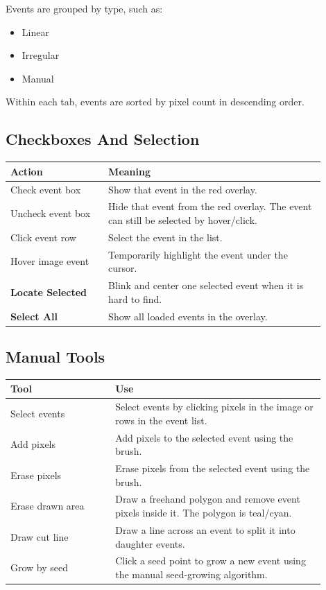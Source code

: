 \documentclass[11pt]{article}
\newcommand{\ui}[1]{\textbf{#1}}
\begin{document}
Events are grouped by type, such as:

\begin{itemize}
    \item Linear
    \item Irregular
    \item Manual
\end{itemize}

Within each tab, events are sorted by pixel count in descending order.

\subsection{Checkboxes And Selection}

\begin{longtable}{p{0.28\linewidth}p{0.62\linewidth}}
\toprule
\textbf{Action} & \textbf{Meaning} \\
\midrule
Check event box & Show that event in the red overlay. \\
Uncheck event box & Hide that event from the red overlay. The event can still be selected by hover/click. \\
Click event row & Select the event in the list. \\
Hover image event & Temporarily highlight the event under the cursor. \\
\ui{Locate Selected} & Blink and center one selected event when it is hard to find. \\
\ui{Select All} & Show all loaded events in the overlay. \\
\bottomrule
\end{longtable}

\subsection{Manual Tools}

\begin{longtable}{p{0.3\linewidth}p{0.6\linewidth}}
\toprule
\textbf{Tool} & \textbf{Use} \\
\midrule
Select events & Select events by clicking pixels in the image or rows in the event list. \\
Add pixels & Add pixels to the selected event using the brush. \\
Erase pixels & Erase pixels from the selected event using the brush. \\
Erase drawn area & Draw a freehand polygon and remove event pixels inside it. The polygon is teal/cyan. \\
Draw cut line & Draw a line across an event to split it into daughter events. \\
Grow by seed & Click a seed point to grow a new event using the manual seed-growing algorithm. \\
\bottomrule
\end{longtable}
\end{document}
